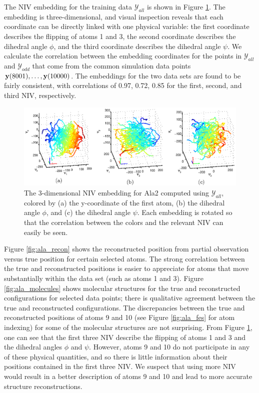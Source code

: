The NIV embedding for the training data $\mathcal{Y}_{all}$ is shown in Figure \ref{fig:ala_embed}.
%
The embedding is three-dimensional, and visual inspection reveals that each coordinate can be directly linked with one physical variable:
the first coordinate describes the flipping of atoms 1 and 3, the second coordinate describes the dihedral angle $\phi$, and the third coordinate describes the dihedral angle $\psi$.
%
We calculate the correlation between the embedding coordinates for the points in $\mathcal{Y}_{all}$ and $\mathcal{Y}_{odd}$
that come from the common simulation data points $\mathbf{y}(8001), \dots, \mathbf{y}(10000)$.
%
The embeddings for the two data sets are found to be fairly consistent, with correlations of 0.97, 0.72, 0.85 for the first, second, and third NIV, respectively.

\begin{figure}[t]
    \includegraphics[width=6in]{fig8}
    \caption[Intrinsic variable embedding for alanine dipeptide data]{The 3-dimensional NIV embedding for Ala2 computed using $\mathcal{Y}_{all}$, colored by (a) the y-coordinate of the first atom, (b) the dihedral angle $\phi$, and (c) the dihedral angle $\psi$. Each embedding is rotated so that the correlation between the colors and the relevant NIV can easily be seen.}
    \label{fig:ala_embed}
\end{figure}


Figure \ref{fig:ala_recon} shows the reconstructed position from partial observation versus true position for certain selected atoms.
%
The strong correlation between the true and reconstructed positions is easier to appreciate for
atoms that move substantially within the data set (such as atoms 1 and 3).
%
Figure \ref{fig:ala_molecules} shows molecular structures for the true and reconstructed configurations for selected data points;
there is qualitative agreement between the true and reconstructed configurations.
%
The discrepancies between the true and reconstructed positions of atoms 9 and 10 (see Figure \ref{fig:ala_fes} for atom indexing) for some of the molecular structures are not surprising.
%
From Figure \ref{fig:ala_embed}, one can see that the first three NIV describe the flipping of atoms 1 and 3 and the dihedral angles $\phi$ and $\psi$.
%
However, atoms 9 and 10 do not participate in any of these physical quantities, and so there is little information about their positions contained in the first three NIV.
%
We suspect that using more NIV would result in a better description of atoms 9 and 10 and lead to more accurate structure reconstructions.

